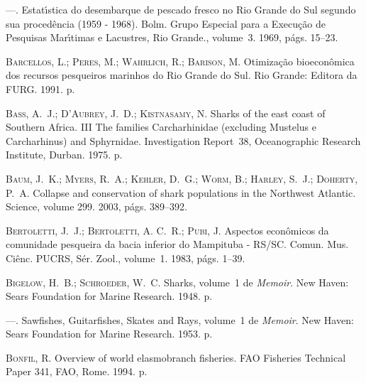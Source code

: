 \documentclass[a4paper,11pt,twoside,showtrims,onecolumn,openright,final]{memoir}
\begin{document}
\begin{thebibliography}{194}
---.
\newblock Estat\'{\i}stica do desembarque de pescado fresco no {R}io {G}rande
  do {S}ul segundo sua proced\^encia (1959 - 1968).
\newblock Bolm. Grupo Especial para a Execu\c{c}\~ao de Pesquisas
  Mar\'{\i}timas e Lacustres, Rio Grande., volume~3. 1969, p\'ags. 15--23.

\textsc{Barcellos, L.; Peres, M.; Wahrlich, R.; Barison, M.}
\newblock Otimiza\c{c}\~ao bioecon\^omica dos recursos pesqueiros marinhos do
  {R}io {G}rande do {S}ul.
\newblock Rio Grande: Editora da FURG. 1991.
 p.

\textsc{Bass, A.~J.; D'Aubrey, J.~D.; Kistnasamy, N.}
\newblock Sharks of the east coast of {S}outhern {A}frica. {III} {T}he families
  {C}archarhinidae (excluding {M}ustelus e {C}archarhinus) and {S}phyrnidae.
\newblock Investigation Report~38, Oceanographic Research Institute, Durban.
  1975.
 p.

\textsc{Baum, J.~K.; Myers, R.~A.; Kehler, D.~G.; Worm, B.; Harley, S.~J.;
  Doherty, P.~A.}
\newblock Collapse and conservation of shark populations in the {N}orthwest
  {A}tlantic.
\newblock Science, volume 299. 2003, p\'ags. 389--392.

\textsc{Bertoletti, J.~J.; Bertoletti, A. C.~R.; Pubi, J.}
\newblock Aspectos econ\^omicos da comunidade pesqueira da bacia inferior do
  {M}ampituba - {RS}/{SC}.
\newblock Comun. Mus. Ci\^enc. PUCRS, S\'er. Zool., volume~1. 1983, p\'ags.
  1--39.

\textsc{Bigelow, H.~B.; Schroeder, W.~C.}
\newblock Sharks, volume~1 de \emph{Memoir}.
\newblock New Haven: Sears Foundation for Marine Research. 1948.
 p.

---.
\newblock Sawfishes, {G}uitarfishes, {S}kates and {R}ays, volume~1 de
  \emph{Memoir}.
\newblock New Haven: Sears Foundation for Marine Research. 1953.
 p.

\textsc{Bonfil, R.}
\newblock Overview of world elasmobranch fisheries.
\newblock FAO Fisheries Technical Paper 341, FAO, Rome. 1994.
 p.


\end{thebibliography}
\end{document}
